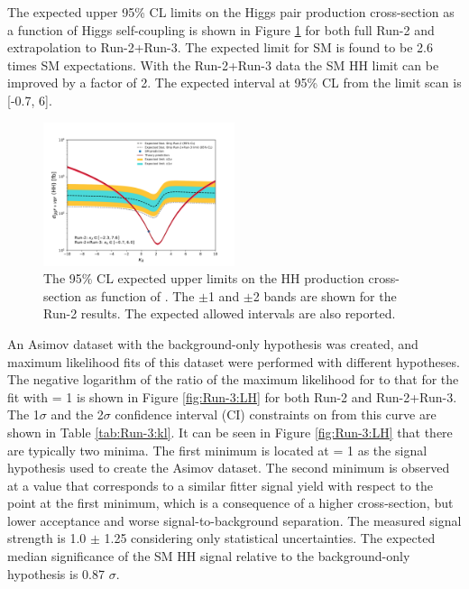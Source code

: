 The expected upper 95\% CL limits on the Higgs pair production cross-section as a function of Higgs self-coupling \kl is shown in Figure \ref{fig:Run-3:Limit} for both full Run-2 and extrapolation to Run-2+Run-3. The expected limit for SM is found to be 2.6 times SM expectations. With the Run-2+Run-3 data the SM HH limit can be improved by a factor of 2. The expected \kl interval at 95\% CL from the limit scan is [-0.7, 6].

\begin{figure}[htbp]
    \centering
    \includegraphics[width=0.5\textwidth]{Ch6/Img/kappa_lambda_Run_2_Run_3_stat.pdf}
     \begin{tcolorbox}[colback=black!5!white, colframe=white!75!black]
    \caption{The 95\% CL expected upper limits on the HH production cross-section as function of \kl. The $\pm$1 and $\pm$2 bands are shown for the Run-2 results. The expected allowed \kl intervals are also reported.}
    \label{fig:Run-3:Limit}
    \end{tcolorbox}
\end{figure}

An Asimov dataset with the background-only hypothesis was created, and maximum likelihood fits of this dataset were performed with different \kl hypotheses. The negative logarithm of the ratio of the maximum likelihood for \kl to that for the fit with \kl= 1 is shown in Figure \ref{fig:Run-3:LH} for both Run-2 and Run-2+Run-3. The 1$\sigma$ and the 2$\sigma$ confidence interval (CI) constraints on \kl from this curve are shown in Table \ref{tab:Run-3:kl}. It can be seen in Figure \ref{fig:Run-3:LH} that there are typically two minima. The first minimum is located at \kl= 1 as the signal hypothesis used to create the Asimov dataset. The second minimum is observed at a \kl value that corresponds to a similar fitter signal yield with respect to the \kl point at the first minimum, which is a consequence of a higher cross-section, but lower acceptance and worse signal-to-background separation. The measured signal strength is 1.0 $\pm$ 1.25 considering only statistical uncertainties. The expected median significance of the SM HH signal relative to the background-only hypothesis is 0.87 $\sigma$. 

